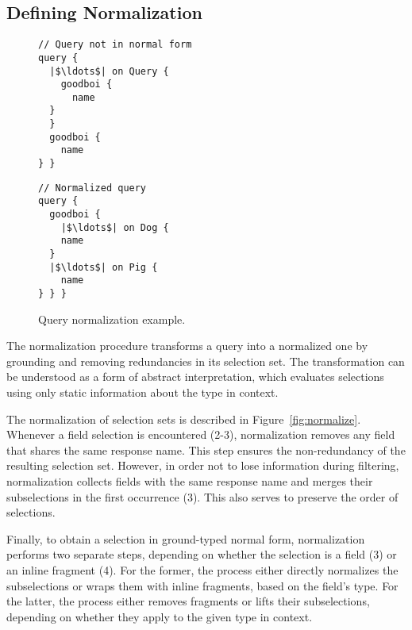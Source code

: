 \subsection{Defining Normalization}\label{subsec:normalization}

\begin{figure}[t]
\begin{minipage}[t]{.25\textwidth}
\begin{verbatim}
// Query not in normal form
query {
  |$\ldots$| on Query {
    goodboi {
      name
  }
  }
  goodboi {
    name
} }
\end{verbatim}
\end{minipage}%
\begin{minipage}[t]{.25\textwidth}
\begin{verbatim}
// Normalized query
query {
  goodboi {
    |$\ldots$| on Dog {
    name
  }
  |$\ldots$| on Pig {
    name
} } }
\end{verbatim} 
\end{minipage}
\caption{Query normalization example.}
\label{fig:norm-example}
\end{figure}

The normalization procedure transforms a query into a normalized one by grounding and removing redundancies in its selection set. The transformation can be understood as a form of abstract interpretation, which evaluates selections using only static information about the type in context.

The normalization of selection sets is described in Figure~\ref{fig:normalize}. Whenever a field selection is encountered (2-3), normalization
removes any field that shares the same response name. This step ensures the non-redundancy of the resulting selection set. 
However, in order not to lose information during filtering, normalization collects fields with the same response name and merges their subselections in the first occurrence (3). This also serves to preserve the order of selections.

Finally, to obtain a selection in ground-typed normal form, normalization performs two separate steps, depending on whether the selection is a field (3) or an inline fragment (4). For the former, the process either directly normalizes the subselections or wraps them with inline fragments, based on the field's type.
For the latter, the process either removes fragments or lifts their subselections, depending on whether they apply to the given type in context.

